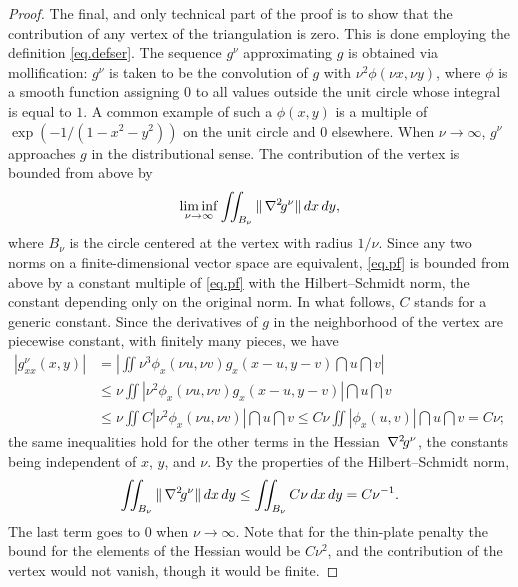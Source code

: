 \begin{proof}
The final, and only technical part of the proof is to show that the
contribution of any vertex of the triangulation is zero. This is done
employing the definition \eqref{eq.defser}.  The sequence $g^\nu$
approximating $g$ is obtained via mollification: $g^\nu$ is taken to
be the convolution of $g$ with $\nu^2 \phi(\nu x, \nu y)$, where
$\phi$ is a smooth function assigning $0$ to all values outside the
unit circle whose integral is equal to $1$.  A common example of
such a $\phi(x,y)$ is a multiple of
$\exp (-1/(1-x^2-y^2))$ on the unit circle and $0$ elsewhere. 
When $\nu \to \infty$, $g^\nu$
approaches $g$ in the distributional sense. The contribution of the
vertex is bounded from above by
\begin{equation}
\label{eq.pf}
\liminf_{\nu \to \infty} \iint_{B_\nu} \| \,\nabla^2\! g^\nu \| \,d x \,d y,
\end{equation}
where $B_\nu$ is the circle centered at the vertex with radius
$1/\nu$. Since any two norms on a finite-dimensional vector space are
equivalent, \eqref{eq.pf} is bounded from above by a constant multiple
of \eqref{eq.pf} with the Hilbert--Schmidt norm, the constant depending
only on the original norm. In what follows, $C$ stands for a generic
constant. Since the derivatives of $g$ in the neighborhood of the
vertex are piecewise constant, with finitely many pieces, we have
\begin{equation*}
\begin{split}
| g^\nu_{xx} (x,y) | &= 
	\left| \iint  \nu^3 
	\phi_x(\nu u, \nu v) 
	g_x (x-u, y-v) \dint u \dint v \right|
\\
&\leq \nu \iint \left| \nu^2 
	\phi_x(\nu u, \nu v) 
	g_x (x-u, y-v) \right| \dint u \dint v
\\
&\leq \nu \iint C 
	\left| \nu^2 \phi_x(\nu u, \nu v) \right| \dint u \dint v
\leq C \nu \iint  
	\left| \phi_x(u, v) \right| \dint u \dint v = C \nu;
\end{split}
\end{equation*}
the same inequalities hold for the other terms in the Hessian $\,\nabla^2\!
g^\nu$, the constants being independent of $x$, $y$, and $\nu$. By the
properties of the Hilbert--Schmidt norm,   
\begin{equation*}
\iint_{B_\nu} \| \,\nabla^2\! g^\nu \| \,d x \,d y
\leq \iint_{B_\nu} C \nu \,d x \,d y = C \nu^{-1}.
\end{equation*}
The last term goes to $0$ when $\nu \to \infty$. Note that for the
thin-plate penalty the bound for the elements of the Hessian would be
$C \nu^2$, and the contribution of the vertex would not vanish, though
it would be finite.  
\end{proof}
\vspace{5mm}

